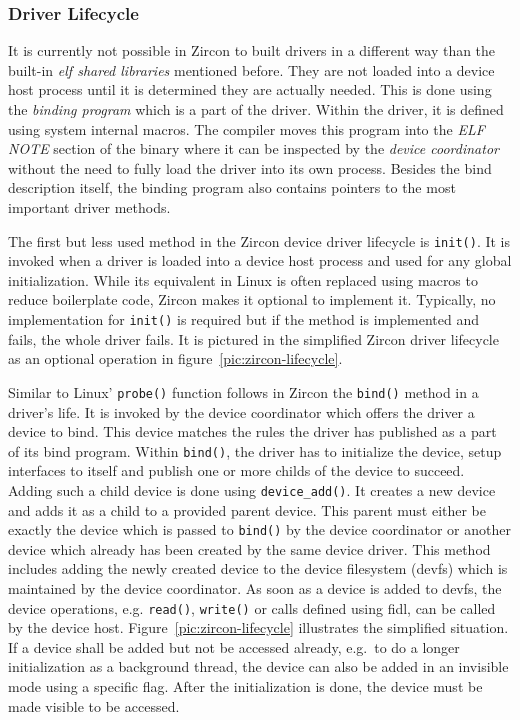 \subsubsection*{Driver Lifecycle}\label{sec:zirconlifecycle}
It is currently not possible in Zircon to built drivers in a different way than the built-in \textit{\ac{elf} shared libraries} mentioned before.
They are not loaded into a device host process until it is determined they are actually needed.
This is done using the \textit{binding program} which is a part of the driver.
Within the driver, it is defined using system internal macros.
The compiler moves this program into the \textit{ELF NOTE} section of the binary where it can be inspected by the \textit{device coordinator} without the need to fully load the driver into its own process.
Besides the bind description itself, the binding program also contains pointers to the most important driver methods\cite{zircon-devicemodel}.

The first but less used method in the Zircon device driver lifecycle is \texttt{init()}.
It is invoked when a driver is loaded into a device host process and used for any global initialization.
While its equivalent in Linux is often replaced using macros to reduce boilerplate code, Zircon makes it optional to implement it.
Typically, no implementation for \texttt{init()} is required but if the method is implemented and fails, the whole driver fails\cite{zircon-devicemodel}.
It is pictured in the simplified Zircon driver lifecycle as an optional operation in figure~\ref{pic:zircon-lifecycle}.

Similar to Linux' \texttt{probe()} function follows in Zircon the \texttt{bind()} method in a driver's life.
It is invoked by the device coordinator which offers the driver a device to bind.
This device matches the rules the driver has published as a part of its bind program.
Within \texttt{bind()}, the driver has to initialize the device, setup interfaces to itself and publish one or more childs of the device to succeed\cite{zircon-ddk-gettingstarted}.
Adding such a child device is done using \texttt{device\_add()}.
It creates a new device and adds it as a child to a provided parent device.
This parent must either be exactly the device which is passed to \texttt{bind()} by the device coordinator or another device which already has been created by the same device driver.
This method includes adding the newly created device to the device filesystem (devfs) which is maintained by the device coordinator.
As soon as a device is added to devfs, the device operations, e.g. \texttt{read()}, \texttt{write()} or calls defined using \ac{fidl}, can be called by the device host.
Figure~\ref{pic:zircon-lifecycle} illustrates the simplified situation.
If a device shall be added but not be accessed already, e.g.\ to do a longer initialization as a background thread, the device can also be added in an invisible mode using a specific flag.
After the initialization is done, the device must be made visible to be accessed\cite{zircon-devicemodel}.

